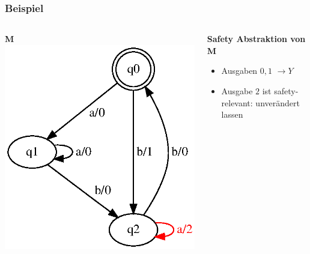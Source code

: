 \begin{frame}
\frametitle{Beispiel}
\begin{columns}[T] %

\begin{column}{.50\textwidth}
\textbf{M}
\includegraphics[width=\textwidth]{images/fsm-example01}
\end{column}%

\begin{column}{.50\textwidth}
\textbf{Safety Abstraktion von M}\\
\begin{itemize}
\item Ausgaben $0,1$  $\rightarrow Y$
\item Ausgabe $2$ ist safety-relevant: unverändert lassen
\end{itemize}
\end{column}%
\end{columns}
\end{frame}



